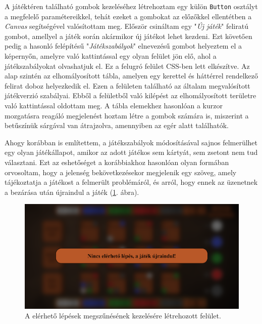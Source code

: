 
A játéktéren található gombok kezeléséhez létrehoztam egy külön \texttt{Button} osztályt a megfelelő paramétereikkel, tehát ezeket a gombokat az előzőkkel ellentétben a \textit{Canvas} segítségével valósítottam meg. Először csináltam egy "\textit{Új játék}" feliratú gombot, amellyel a játék során akármikor új játékot lehet kezdeni. Ezt követően pedig a hasonló felépítésű "\textit{Játékszabályok}" elnevezésű gombot helyeztem el a képernyőn, amelyre való kattintással egy olyan felület jön elő, ahol a játékszabályokat olvashatjuk el. Ez a felugró felület CSS-ben lett elkészítve. Az alap szintén az elhomályosított tábla, amelyen egy kerettel és háttérrel rendelkező felirat doboz helyezkedik el. Ezen a felületen található az általam megvalósított játékverzió szabályai. Ebből a felületből való kilépést az elhomályosított területre való kattintással oldottam meg. A tábla elemekhez hasonlóan a kurzor mozgatásra reagáló megjelenést hoztam létre a gombok számára is, miszerint a betűszínük sárgával van átrajzolva, amennyiben az egér alatt találhatók.



Ahogy korábban is említettem, a játékszabályok módosításával sajnos felmerülhet egy olyan játékállapot, amikor az adott játékos sem kártyát, sem zsetont nem tud választani. Ezt az eshetőséget a korábbiakhoz hasonlóan olyan formában orvosoltam, hogy a jelenség bekövetkezésekor megjelenik egy szöveg, amely tájékoztatja a játékost a felmerült problémáról, és arról, hogy ennek az üzenetnek a bezárása után újraindul a játék (\ref{fig:impossible_action}. ábra).

\begin{figure}[h]
\centering
\includegraphics[width=\textwidth]{images/impossible_action.png}
\caption{A elérhető lépések megszűnésének kezelésére létrehozott felület.}
\label{fig:impossible_action}
\end{figure}


